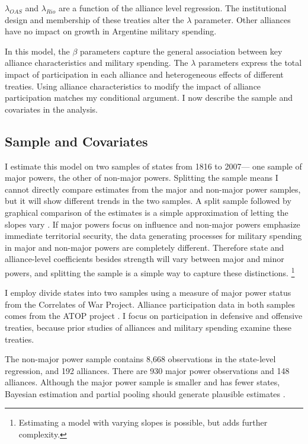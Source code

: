 \documentclass[12pt]{article}
\begin{document}
$\lambda_{OAS}$ and $\lambda_{Rio}$ are a function of the alliance level regression. 
The institutional design and membership of these treaties alter the $\lambda$ parameter.
Other alliances have no impact on growth in Argentine military spending. 


In this model, the $\beta$ parameters capture the general association between key alliance characteristics and military spending. 
The $\lambda$ parameters express the total impact of participation in each alliance and heterogeneous effects of different treaties. 
Using alliance characteristics to modify the impact of alliance participation matches my conditional argument. 
I now describe the sample and covariates in the analysis.  



\subsection{Sample and Covariates} 

I estimate this model on two samples of states from 1816 to 2007--- one sample of major powers, the other of non-major powers. 
Splitting the sample means I cannot directly compare estimates from the major and non-major power samples, but it will show different trends in the two samples. 
A split sample followed by graphical comparison of the estimates is a simple approximation of letting the slopes vary \citep{GelmanHill2007}. If major powers focus on influence and non-major powers emphasize immediate territorial security, the data generating processes for military spending in major and non-major powers are completely different.
Therefore state and alliance-level coefficients besides strength will vary between major and minor powers, and splitting the sample is a simple way to capture these distinctions.
\footnote{Estimating a model with varying slopes is possible, but adds further complexity.} 



I employ divide states into two samples using a measure of major power status from the Correlates of War Project. 
Alliance participation data in both samples comes from the ATOP project \citep{Leedsetal2002}. 
I focus on participation in defensive and offensive treaties, because prior studies of alliances and military spending examine these treaties. 


The non-major power sample contains 8,668 observations in the state-level regression, and 192 alliances. 
There are 930 major power observations and 148 alliances. 
Although the major power sample is smaller and has fewer states, Bayesian estimation and partial pooling should generate plausible estimates \citep{Stegmueller2013}. 
\end{document}
